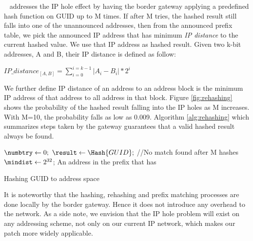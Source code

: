         \arcName~ addresses the IP hole effect by having the border gateway applying a predefined hash function on GUID up to M times. If after M tries, the hashed result still falls into one of the unannounced addresses, then from the announced prefix table, we pick the announced IP address that has minimum \emph{IP distance} to the current hashed value. We use that IP address as hashed result. Given two k-bit addresses, A and B, their IP distance is defined as follow:
        \begin{center} $IP\_distance_{[A,B]} = \displaystyle\sum\limits_{i=0}^{i=k-1} |A_i - B_i|*2^{i}$ \end{center}
        We further define IP distance of an address to an address block is the minimum IP address of that address to all address in that block.
        Figure \ref{fig:rehashing} shows the probability of the hashed result falling into the IP holes as M increases. With M=10, the probability falls as low as 0.009. Algorithm \ref{alg:rehashing} which summarizes steps taken by the gateway guarantees that a valid hashed result always be found.
       {\footnotesize
        \begin{algorithm}
            \DontPrintSemicolon
            \SetAlFnt{\small\sf}
            \BlankLine
            $\numbtry \leftarrow 0 ;$\;
            $\result \leftarrow \Hash{GUID};$\;
            //No match found after M hashes\;
            $\mindist \leftarrow 2^{32}$;\;
            \Return An address in the prefix that has \mindist\;
         \caption{Hashing GUID to address space} \label{alg:rehashing}
        \end{algorithm}
        }
        It is noteworthy that the hashing, rehashing and prefix matching processes are done locally by the border gateway. Hence it does not introduce any overhead to the network. As a side note, we envision that the IP hole problem will exist on any addressing scheme, not only on our current IP network, which makes our patch more widely applicable.

